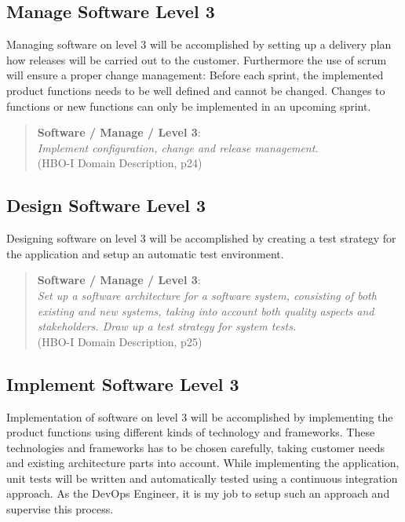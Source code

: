 \subsection{Manage Software Level 3}

Managing software on level 3 will be accomplished by setting up a delivery plan how releases will be carried out to the customer. Furthermore the use of scrum will ensure a proper change management: Before each sprint, the implemented product functions needs to be well defined and cannot be changed. Changes to functions or new functions can only be implemented in an upcoming sprint.

\begin{quote}
	\textbf{Software / Manage / Level 3}: \\
	\textit{Implement configuration, change and release management.} \\
	(HBO-I Domain Description, p24)
\end{quote}

\subsection{Design Software Level 3}

Designing software on level 3 will be accomplished by creating a test strategy for the application and setup an automatic test environment. 

\begin{quote}
	\textbf{Software / Manage / Level 3}: \\
	\textit{
		Set up a software architecture for a software system, consisting of both existing and new systems, taking into account both quality aspects and stakeholders. 
		Draw up a test strategy for system tests.
	} \\ (HBO-I Domain Description, p25)
\end{quote}

\subsection{Implement Software Level 3}

Implementation of software on level 3 will be accomplished by implementing the product functions using different kinds of technology and frameworks. These technologies and frameworks has to be chosen carefully, taking customer needs and existing architecture parts into account.
While implementing the application, unit tests will be written and automatically tested using a continuous integration approach. As the DevOps Engineer, it is my job to setup such an approach and supervise this process.

